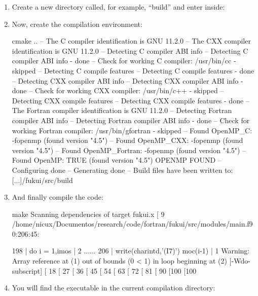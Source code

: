 \documentclass[a4paper,11pt,openany]{memoir}
\begin{document}
\begin{enumerate}
\begin{consola}{vim CMakeLists.txt}
## using ``ifort'':
## >> DEFAULT COMPILER << \#\# Force compiler you want
#set(CMAKE\_Fortran\_COMPILER gfortran)
set(CMAKE\_Fortran\_COMPILER ifort)
#set(CMAKE\_GENERATOR\_FC gfortran)
set(CMAKE\_GENERATOR\_FC ifort)
\end{consola}
	\item Create a new directory called, for example, ``build'' and enter inside:
	\item Now, create the compilation environment:
		\begin{consola}{cmake ..}
-- The C compiler identification is GNU 11.2.0
-- The CXX compiler identification is GNU 11.2.0
-- Detecting C compiler ABI info
-- Detecting C compiler ABI info - done
-- Check for working C compiler: /usr/bin/cc - skipped
-- Detecting C compile features
-- Detecting C compile features - done
-- Detecting CXX compiler ABI info
-- Detecting CXX compiler ABI info - done
-- Check for working CXX compiler: /usr/bin/c++ - skipped
-- Detecting CXX compile features
-- Detecting CXX compile features - done
-- The Fortran compiler identification is GNU 11.2.0
-- Detecting Fortran compiler ABI info
-- Detecting Fortran compiler ABI info - done
-- Check for working Fortran compiler: /usr/bin/gfortran - skipped
-- Found OpenMP_C: -fopenmp (found version "4.5") 
-- Found OpenMP_CXX: -fopenmp (found version "4.5") 
-- Found OpenMP_Fortran: -fopenmp (found version "4.5") 
-- Found OpenMP: TRUE (found version "4.5")  
OPENMP FOUND
-- Configuring done
-- Generating done
-- Build files have been written to: [...]/fukui/src/build
\end{consola}
	\item And finally compile the code:
		\begin{consola}{make}
Scanning dependencies of target fukui.x
[  9%
/home/nicux/Documentos/research/code/fortran/fukui/src/modules/main.f90:206:45:

198 |       do i = 1,imos
|                   2                          
......
206 |                   write(charintd,'(I7)') moc(i-1)
|                                             1
Warning: Array reference at (1) out of bounds (0 < 1) in loop beginning at (2) [-Wdo-subscript]
[ 18%
[ 27%
[ 36%
[ 45%
[ 54%
[ 63%
[ 72%
[ 81%
[ 90%
[100%
[100%
\end{consola}
	\item You will find the executable in the current compilation directory:


\end{enumerate}
\end{document}

